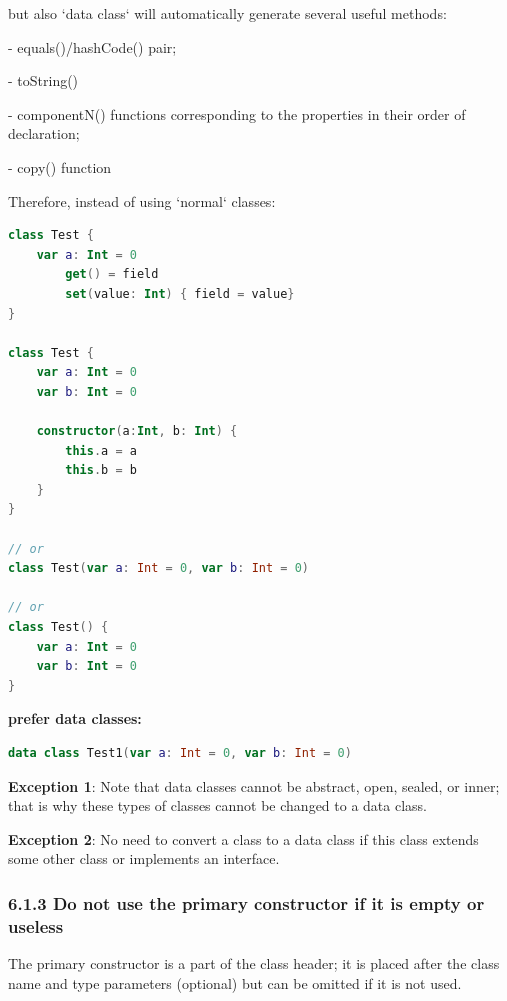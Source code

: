 {{{{but also `data class` will automatically generate several useful methods:

- equals()/hashCode() pair;

- toString()

- componentN() functions corresponding to the properties in their order of declaration;

- copy() function



Therefore, instead of using `normal` classes:



\begin{lstlisting}[language=Kotlin]
class Test {
    var a: Int = 0
        get() = field
        set(value: Int) { field = value}
}

class Test {
    var a: Int = 0
    var b: Int = 0
    
    constructor(a:Int, b: Int) {
        this.a = a
        this.b = b
    }
}

// or
class Test(var a: Int = 0, var b: Int = 0)
 
// or
class Test() {
    var a: Int = 0
    var b: Int = 0
}
\end{lstlisting}


\textbf{prefer data classes:}

\begin{lstlisting}[language=Kotlin]
data class Test1(var a: Int = 0, var b: Int = 0)
\end{lstlisting}


\textbf{Exception 1}: Note that data classes cannot be abstract, open, sealed, or inner; that is why these types of classes cannot be changed to a data class.



\textbf{Exception 2}: No need to convert a class to a data class if this class extends some other class or implements an interface.



\subsubsection*{\textbf{6.1.3 Do not use the primary constructor if it is empty or useless}}
\leavevmode\newline

\label{sec:6.1.3}

The primary constructor is a part of the class header; it is placed after the class name and type parameters (optional) but can be omitted if it is not used.



}}}}
